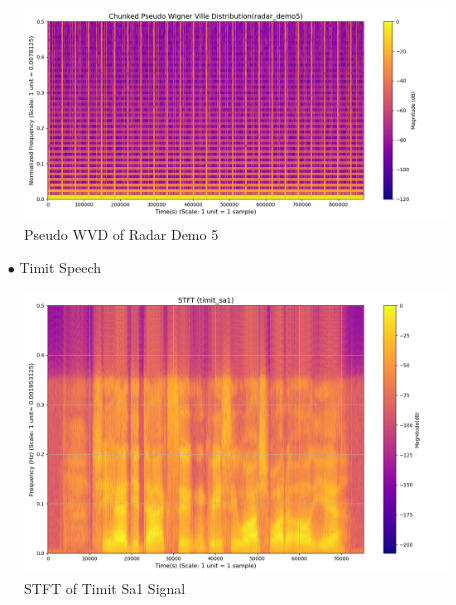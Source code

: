 \documentclass[12pt,a4paper,onecolumn]{exam}
\begin{document}
\begin{solution}
        \begin{figure}[H]
        \centering
        \includegraphics[scale = 0.45]{radar_demo5_pwvd.png}
        \caption{Pseudo WVD of Radar Demo 5}
        \label{fig:50}
        \end{figure}    

      \begin{itemize}
      \item[$\bullet$] Timit Speech
      \end{itemize}

        \begin{figure}[H]
        \centering
        \includegraphics[scale = 0.35]{timit_sa1_stft.png}
        \caption{STFT of Timit Sa1 Signal}
        \label{fig:51}
        \end{figure}


\end{solution}
\end{document}
